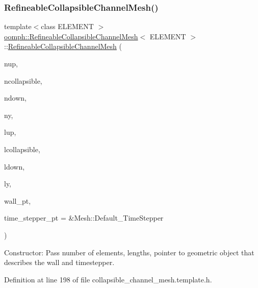 \subsubsection{\texorpdfstring{Refineable\+Collapsible\+Channel\+Mesh()}{RefineableCollapsibleChannelMesh()}}
{\footnotesize\ttfamily template$<$class E\+L\+E\+M\+E\+NT $>$ \\
\hyperlink{classoomph_1_1RefineableCollapsibleChannelMesh}{oomph\+::\+Refineable\+Collapsible\+Channel\+Mesh}$<$ E\+L\+E\+M\+E\+NT $>$\+::\hyperlink{classoomph_1_1RefineableCollapsibleChannelMesh}{Refineable\+Collapsible\+Channel\+Mesh} (\begin{DoxyParamCaption}\item[{const unsigned \&}]{nup,  }\item[{const unsigned \&}]{ncollapsible,  }\item[{const unsigned \&}]{ndown,  }\item[{const unsigned \&}]{ny,  }\item[{const double \&}]{lup,  }\item[{const double \&}]{lcollapsible,  }\item[{const double \&}]{ldown,  }\item[{const double \&}]{ly,  }\item[{Geom\+Object $\ast$}]{wall\+\_\+pt,  }\item[{Time\+Stepper $\ast$}]{time\+\_\+stepper\+\_\+pt = {\ttfamily \&Mesh\+:\+:Default\+\_\+TimeStepper} }\end{DoxyParamCaption})\hspace{0.3cm}{\ttfamily [inline]}}



Constructor\+: Pass number of elements, lengths, pointer to geometric object that describes the wall and timestepper. 



Definition at line 198 of file collapsible\+\_\+channel\+\_\+mesh.\+template.\+h.

\mbox{\label{classoomph_1_1RefineableCollapsibleChannelMesh_ae429201cc0fe53f5abf96b7d9564df65}} 
